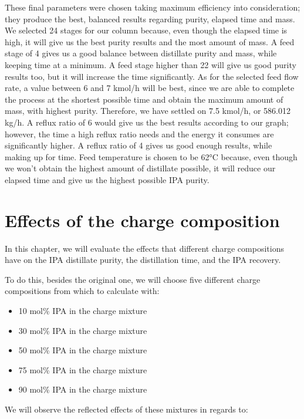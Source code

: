 These final parameters were chosen taking maximum efficiency into
consideration; they produce the best, balanced results regarding purity,
elapsed time and mass. We selected 24 stages for our column because,
even though the elapsed time is high, it will give us the best purity
results and the most amount of mass. A feed stage of 4 gives us a good
balance between distillate purity and mass, while keeping time at a
minimum. A feed stage higher than 22 will give us good purity results
too, but it will increase the time significantly. As for the selected
feed flow rate, a value between 6 and 7 kmol/h will be best, since we
are able to complete the process at the shortest possible time and
obtain the maximum amount of mass, with highest purity. Therefore, we
have settled on 7.5 kmol/h, or 586.012 kg/h. A reflux ratio of 6 would
give us the best results according to our graph; however, the time a
high reflux ratio needs and the energy it consumes are significantly
higher. A reflux ratio of 4 gives us good enough results, while making
up for time. Feed temperature is chosen to be 62°C because, even though
we won't obtain the highest amount of distillate possible, it will
reduce our elapsed time and give us the highest possible IPA purity.

\chapter{Effects of the charge
composition}\label{effects-of-the-charge-composition}

In this chapter, we will evaluate the effects that different charge
compositions have on the IPA distillate purity, the distillation time,
and the IPA recovery.

To do this, besides the original one, we will choose five different
charge compositions from which to calculate with:

\begin{itemize}
\tightlist
\item
  10 mol\% IPA in the charge mixture
\item
  30 mol\% IPA in the charge mixture
\item
  50 mol\% IPA in the charge mixture
\item
  75 mol\% IPA in the charge mixture
\item
  90 mol\% IPA in the charge mixture
\end{itemize}

We will observe the reflected effects of these mixtures in regards to:


